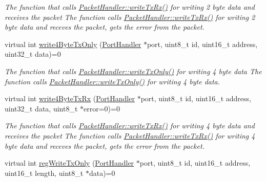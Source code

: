 \begin{DoxyCompactItemize}
\begin{DoxyCompactList}\small\item\em The function that calls \hyperlink{classmercury_1_1_packet_handler_adf35a5000d465bd5426530e34a91a21d}{Packet\+Handler\+::write\+Tx\+Rx()} for writing 2 byte data and receives the packet  The function calls \hyperlink{classmercury_1_1_packet_handler_adf35a5000d465bd5426530e34a91a21d}{Packet\+Handler\+::write\+Tx\+Rx()} for writing 2 byte data and receves the packet,  gets the error from the packet. \end{DoxyCompactList}\item 
virtual int \hyperlink{classmercury_1_1_packet_handler_adf97e077894f1e01f53b7468e4470c19}{write4\+Byte\+Tx\+Only} (\hyperlink{classmercury_1_1_port_handler}{Port\+Handler} $\ast$port, uint8\+\_\+t id, uint16\+\_\+t address, uint32\+\_\+t data)=0
\begin{DoxyCompactList}\small\item\em The function that calls \hyperlink{classmercury_1_1_packet_handler_acf4e01987186250221603f794e7e4b59}{Packet\+Handler\+::write\+Tx\+Only()} for writing 4 byte data  The function calls \hyperlink{classmercury_1_1_packet_handler_acf4e01987186250221603f794e7e4b59}{Packet\+Handler\+::write\+Tx\+Only()} for writing 4 byte data. \end{DoxyCompactList}\item 
virtual int \hyperlink{classmercury_1_1_packet_handler_acd4df6583fcbaf872a4aba6623c9b084}{write4\+Byte\+Tx\+Rx} (\hyperlink{classmercury_1_1_port_handler}{Port\+Handler} $\ast$port, uint8\+\_\+t id, uint16\+\_\+t address, uint32\+\_\+t data, uint8\+\_\+t $\ast$error=0)=0
\begin{DoxyCompactList}\small\item\em The function that calls \hyperlink{classmercury_1_1_packet_handler_adf35a5000d465bd5426530e34a91a21d}{Packet\+Handler\+::write\+Tx\+Rx()} for writing 4 byte data and receives the packet  The function calls \hyperlink{classmercury_1_1_packet_handler_adf35a5000d465bd5426530e34a91a21d}{Packet\+Handler\+::write\+Tx\+Rx()} for writing 4 byte data and receves the packet,  gets the error from the packet. \end{DoxyCompactList}\item 
virtual int \hyperlink{classmercury_1_1_packet_handler_a0b0daaabd6473e14b2fbfbbf3260bc7b}{reg\+Write\+Tx\+Only} (\hyperlink{classmercury_1_1_port_handler}{Port\+Handler} $\ast$port, uint8\+\_\+t id, uint16\+\_\+t address, uint16\+\_\+t length, uint8\+\_\+t $\ast$data)=0

\end{DoxyCompactItemize}
